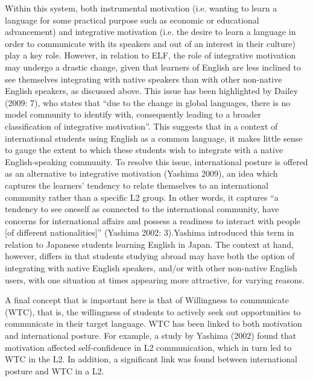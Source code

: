 \documentclass[12pt]{article}
\newenvironment{styleStandard}{\setlength\leftskip{0cm}\setlength\rightskip{0cm plus 1fil}\setlength\parindent{0cm}\setlength\parfillskip{0pt plus 1fil}\setlength\parskip{0in plus 1pt}\writerlistparindent\writerlistleftskip\leavevmode\normalfont\normalsize\writerlistlabel\ignorespaces}{\unskip\vspace{0.111in plus 0.0111in}\par}
\newcommand\writerlistleftskip{}
\newcommand\writerlistparindent{}
\newcommand\writerlistlabel{}
\begin{document}
\begin{styleStandard}
Within this system, both instrumental motivation (i.e. wanting to learn a language for some practical purpose such as economic or educational advancement) and integrative motivation (i.e. the desire to learn a language in order to communicate with its speakers and out of an interest in their culture) play a key role. However, in relation to ELF, the role of integrative motivation may undergo a drastic change, given that learners of English are less inclined to see themselves integrating with native speakers than with other non-native English speakers, as discussed above. This issue has been highlighted by Dailey (2009: 7), who states that “due to the change in global languages, there is no model community to identify with, consequently leading to a broader classification of integrative motivation”. This suggests that in a context of international students using English as a common language, it makes little sense to gauge the extent to which these students wish to integrate with a native English-speaking community. To resolve this issue, international posture is offered as an alternative to integrative motivation (Yashima 2009), an idea which captures the learners’ tendency to relate themselves to an international community rather than a specific L2 group. In other words, it captures “a tendency to see oneself as connected to the international community, have concerns for international affairs and possess a readiness to interact with people [of different nationalities]” (Yashima 2002: 3).Yashima introduced this term in relation to Japanese students learning English in Japan. The context at hand, however, differs in that students studying abroad may have both the option of integrating with native English speakers, and/or with other non-native English users, with one situation at times appearing more attractive, for varying reasons. 
\end{styleStandard}

\begin{styleStandard}
A final concept that is important here is that of Willingness to communicate (WTC), that is, the willingness of students to actively seek out opportunities to communicate in their target language. WTC has been linked to both motivation and international posture. For example, a study by Yashima (2002) found that motivation affected self-confidence in L2 communication, which in turn led to WTC in the L2. In addition, a significant link was found between international posture and WTC in a L2.
\end{styleStandard}
\end{document}
